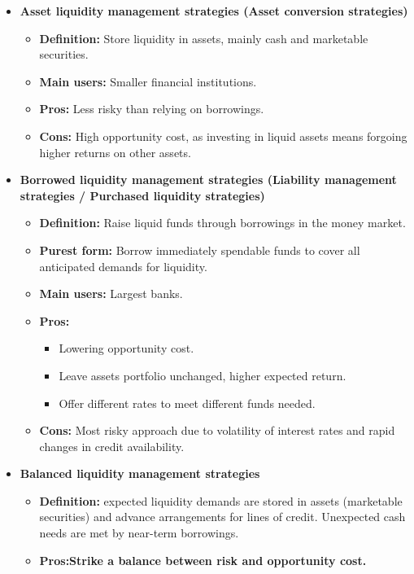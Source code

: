 \begin{itemize}
    \item \textbf{Asset liquidity management strategies (Asset conversion strategies)}
      \begin{itemize}
        \item \textbf{Definition:} Store liquidity in assets, mainly cash and marketable securities.
        \item \textbf{Main users:} Smaller financial institutions.
        \item \textbf{Pros:} Less risky than relying on borrowings.
        \item \textbf{Cons:} High opportunity cost, as investing in liquid assets means forgoing higher returns on other assets.
      \end{itemize}
    \item \textbf{Borrowed liquidity management strategies (Liability management strategies / Purchased liquidity strategies)}
      \begin{itemize}
        \item \textbf{Definition:} Raise liquid funds through borrowings in the money market.
        \item \textbf{Purest form:} Borrow immediately spendable funds to cover all anticipated demands for liquidity.
        \item \textbf{Main users:} Largest banks.
        \item \textbf{Pros:}
          \begin{itemize}
            \item Lowering opportunity cost.
            \item Leave assets portfolio unchanged, higher expected return.
            \item Offer different rates to meet different funds needed.
          \end{itemize}
        \item \textbf{Cons:} Most risky approach due to volatility of interest rates and rapid changes in credit availability.
      \end{itemize}
      \item \textbf{Balanced liquidity management strategies}
      \begin{itemize}
        \item \textbf{Definition:} expected liquidity demands are stored in assets (marketable securities) and advance arrangements for lines of credit. Unexpected cash needs are met by near-term borrowings.
        
        \item \textbf{Pros:Strike a balance between risk and opportunity cost.}
      
      \end{itemize}
  \end{itemize}


